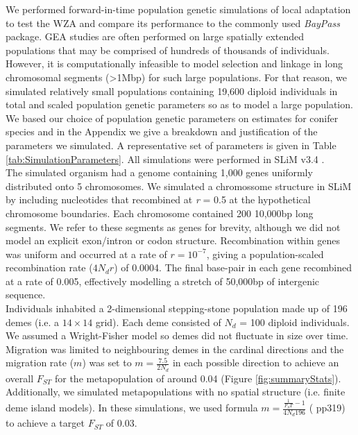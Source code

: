 \documentclass[10pt,twoside,lineno, twocolumn]{GSA_format}
\begin{document}
We performed forward-in-time population genetic simulations of local adaptation to test the WZA and compare its performance to the commonly used \textit{BayPass} package. GEA studies are often performed on large spatially extended populations that may be comprised of hundreds of thousands of individuals. However, it is computationally infeasible to model selection and linkage in long chromosomal segments (>1Mbp) for such large populations. For that reason, we simulated relatively small populations containing 19,600 diploid individuals in total and scaled population genetic parameters so as to model a large population. We based our choice of population genetic parameters on estimates for conifer species and in the Appendix we give a breakdown and justification of the parameters we simulated. A representative set of parameters is given in Table \ref{tab:SimulationParameters}. All simulations were performed in SLiM v3.4 \cite{Haller2019}. \\

The simulated organism had a genome containing 1,000 genes uniformly distributed onto 5 chromosomes. We simulated a chromossome structure in SLiM by including nucleotides that recombined at \textit{r} = 0.5 at the hypothetical chromosome boundaries. Each chromosome contained 200 10,000bp long segments. We refer to these segments as genes for brevity, although we did not model an explicit exon/intron or codon structure. Recombination within genes was uniform and occurred at a rate of $r = 10^{-7}$, giving a population-scaled recombination rate ($4N_dr$) of 0.0004. The final base-pair in each gene recombined at a rate of 0.005, effectively modelling a stretch of 50,000bp of intergenic sequence. \\

Individuals inhabited a 2-dimensional stepping-stone population made up of 196 demes (i.e. a $14\times14$ grid). Each deme consisted of $N_d$ = 100 diploid individuals. We assumed a Wright-Fisher model so demes did not fluctuate in size over time. Migration was limited to neighbouring demes in the cardinal directions and the migration rate ($m$) was set to $m = \frac{7.5}{2N_d}$ in each possible direction to achieve an overall $F_{ST}$ for the metapopulation of around 0.04 (Figure \ref{fig:summaryStats}). Additionally, we simulated metapopulations with no spatial structure (i.e. finite deme island models). In these simulations, we used formula $m = \frac{\frac{1}{F_ST} - 1}{4N_d196}$ (\citeauthor{RN173} \citeyear{RN173} pp319) to achieve a target $F_{ST}$ of 0.03.\\
\end{document}

